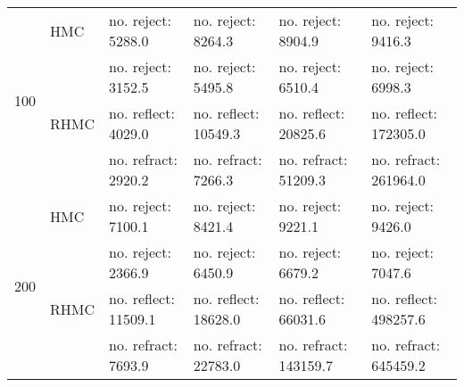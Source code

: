 \documentclass{article} %
\begin{document}
\begin {table}
\begin{tabular}{llllll}
 \multirow{4}{*}{100}& HMC &  no. reject: 5288.0& no. reject: 8264.3 & no. reject: 8904.9& no. reject: 9416.3\vspace{3pt}\\
%
& \multirow{3}{*}{RHMC}& no. reject: 3152.5& no. reject: 5495.8& no. reject: 6510.4& no. reject: 6998.3\\ 
& &        no. reflect: 4029.0& no. reflect: 10549.3& no. reflect: 20825.6& no. reflect: 172305.0\\ 
& &          no. refract: 2920.2& no. refract: 7266.3& no. refract: 51209.3& no. refract: 261964.0\vspace{12pt}\\ 
\multirow{4}{*}{200}& HMC &  no. reject: 7100.1& no. reject: 8421.4 & no. reject: 9221.1& no. reject: 9426.0\vspace{3pt}\\
%
& \multirow{3}{*}{RHMC}& no. reject: 2366.9& no. reject: 6450.9& no. reject: 6679.2& no. reject: 7047.6\\ 
& &        no. reflect: 11509.1& no. reflect: 18628.0& no. reflect: 66031.6& no. reflect: 498257.6\\ 
& &          no. refract: 7693.9& no. refract: 22783.0& no. refract: 143159.7& no. refract: 645459.2\vspace{12pt}\\ 
\hline \end{tabular}
\end{table}
\end{document}
